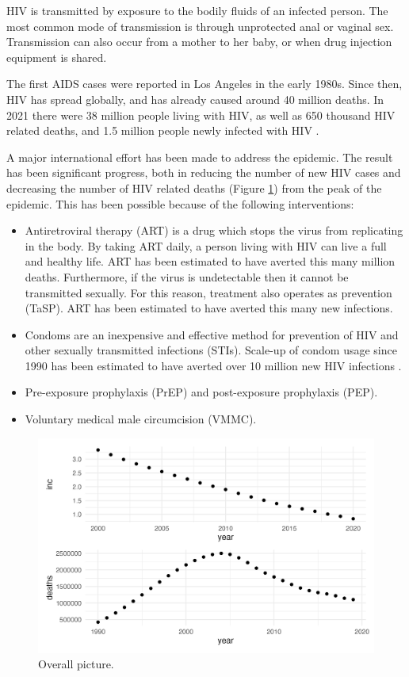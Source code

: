 \documentclass[a4paper, nobind]{templates/ociamthesis}
\providecommand{\tightlist}{%
  \setlength{\itemsep}{0pt}\setlength{\parskip}{0pt}}
\begin{document}
HIV is transmitted by exposure to the bodily fluids of an infected person.
The most common mode of transmission is through unprotected anal or vaginal sex.
Transmission can also occur from a mother to her baby, or when drug injection equipment is shared.

The first AIDS cases were reported in Los Angeles in the early 1980s.
Since then, HIV has spread globally, and has already caused around 40 million deaths.
In 2021 there were 38 million people living with HIV, as well as 650 thousand HIV related deaths, and 1.5 million people newly infected with HIV \autocite{unaids2021global}.

A major international effort has been made to address the epidemic.
The result has been significant progress, both in reducing the number of new HIV cases and decreasing the number of HIV related deaths (Figure \ref{fig:overall-picture}) from the peak of the epidemic.
This has been possible because of the following interventions:

\begin{itemize}
\tightlist
\item
  Antiretroviral therapy (ART) is a drug which stops the virus from replicating in the body.
  By taking ART daily, a person living with HIV can live a full and healthy life.
  ART has been estimated to have averted this many million deaths.
  Furthermore, if the virus is undetectable then it cannot be transmitted sexually.
  For this reason, treatment also operates as prevention (TaSP).
  ART has been estimated to have averted this many new infections.
\item
  Condoms are an inexpensive and effective method for prevention of HIV and other sexually transmitted infections (STIs).
  Scale-up of condom usage since 1990 has been estimated to have averted over 10 million new HIV infections \autocite{stover2021impact}.
\item
  Pre-exposure prophylaxis (PrEP) and post-exposure prophylaxis (PEP).
\item
  Voluntary medical male circumcision (VMMC).
\end{itemize}

\begin{figure}

{\centering \includegraphics[width=0.95\linewidth]{figures/overall-picture} 

}

\caption{Overall picture.}\label{fig:overall-picture}
\end{figure}
\end{document}
